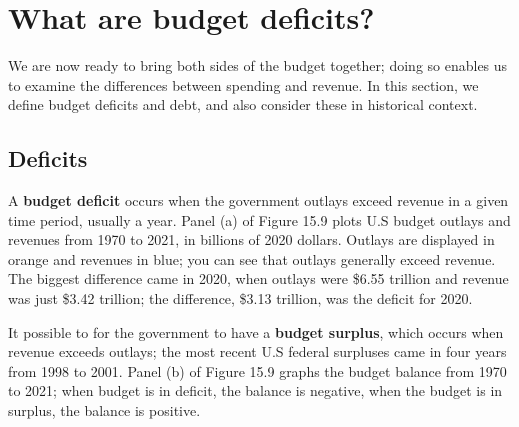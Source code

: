 \documentclass[11pt]{article} %
\begin{document}
\section*{What are budget deficits?}
We are now ready to bring both sides of the budget together; doing so enables us to examine the differences between spending and revenue. In this section, we define budget deficits and debt, and also consider these in historical context.

\subsection*{Deficits}
A \textbf{budget deficit} occurs when the government outlays exceed revenue in a given time period, usually a year. Panel (a) of Figure 15.9 plots U.S budget outlays and revenues from 1970 to 2021, in billions of 2020 dollars. Outlays are displayed in orange and revenues in blue; you can see that outlays generally exceed revenue. The biggest difference came in 2020, when outlays were \$6.55 trillion and revenue was just \$3.42 trillion; the difference, \$3.13 trillion, was the deficit for 2020.

It possible to for the government to have a \textbf{budget surplus}, which occurs when revenue exceeds outlays; the most recent U.S federal surpluses came in four years from 1998 to 2001. Panel (b) of Figure 15.9 graphs the budget balance from 1970 to 2021; when budget is in deficit, the balance is negative, when the budget is in surplus, the balance is positive.
\end{document}
